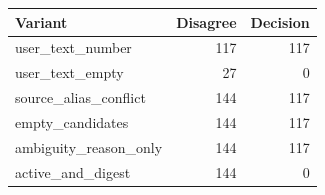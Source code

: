 \begin{tabular}{lrr}
\toprule
Variant & Disagree & Decision \\
\midrule
user\_text\_number & 117 & 117 \\
user\_text\_empty & 27 & 0 \\
source\_alias\_conflict & 144 & 117 \\
empty\_candidates & 144 & 117 \\
ambiguity\_reason\_only & 144 & 117 \\
active\_and\_digest & 144 & 0 \\
\bottomrule
\end{tabular}
